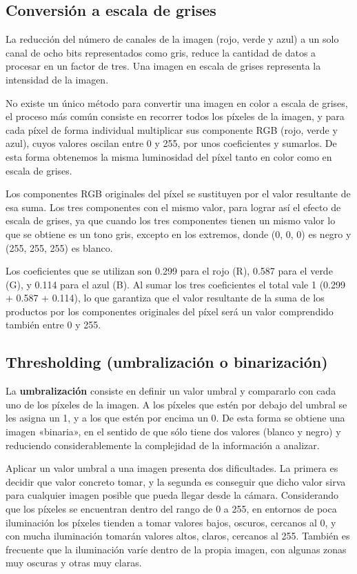 \subsection{Conversión a escala de grises}
La reducción del número de canales de la imagen (rojo, verde y azul) a un solo canal de ocho bits representados como gris, reduce la cantidad de datos a procesar en un factor de tres. Una imagen en escala de grises representa la intensidad de la imagen. 

No existe un único método para convertir una imagen en color a escala de grises, el proceso más común consiste en recorrer todos los píxeles de la imagen, y para cada píxel de forma individual multiplicar sus componente RGB (rojo, verde y azul), cuyos valores oscilan entre 0 y 255, por unos coeficientes y sumarlos. De esta forma obtenemos la misma luminosidad del píxel tanto en color como en escala de grises.

Los componentes RGB originales del píxel se sustituyen por el valor resultante de esa suma. Los tres componentes con el mismo valor, para lograr así el efecto de escala de grises, ya que cuando los tres componentes tienen un mismo valor lo que se obtiene es un tono gris, excepto en los extremos, donde (0, 0, 0) es negro y (255, 255, 255) es blanco.

Los coeficientes que se utilizan son 0.299 para el rojo (R), 0.587 para el verde (G), y 0.114 para el azul (B). Al sumar los tres coeficientes el total vale 1 (0.299 + 0.587 + 0.114), lo que garantiza que el valor resultante de la suma de los productos por los componentes originales del píxel será un valor comprendido también entre 0 y 255.

\subsection{Thresholding (umbralización o binarización)}
La \textbf{umbralización} consiste en definir un valor umbral y compararlo con cada uno de los píxeles de la imagen. A los píxeles que estén por debajo del umbral se les asigna un 1, y a los que estén por encima un 0. De esta forma se obtiene una imagen «binaria», en el sentido de que sólo tiene dos valores (blanco y negro) y reduciendo considerablemente la complejidad de la información a analizar.

Aplicar un valor umbral a una imagen presenta dos dificultades. La primera es decidir que valor concreto tomar, y la segunda es conseguir que dicho valor sirva para cualquier imagen posible que pueda llegar desde la cámara. Considerando que los píxeles se encuentran dentro del rango de 0 a 255, en entornos de poca iluminación los píxeles tienden a tomar valores bajos, oscuros, cercanos al 0, y con mucha iluminación tomarán valores altos, claros, cercanos al 255. También es frecuente que la iluminación varíe dentro de la propia imagen, con algunas zonas muy oscuras y otras muy claras.

